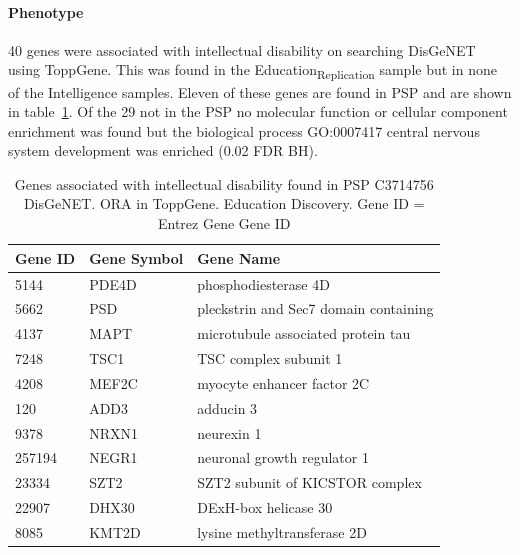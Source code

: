             \paragraph{Phenotype}
            40 genes were associated with intellectual disability on searching DisGeNET using ToppGene. This was found in the Education\textsubscript{Replication} sample but in none of the Intelligence samples. Eleven of these genes are found in PSP and are shown in table~\ref{tab:Genes associated with intellectual disability found in PSP Education Discovery}. 
            Of the 29 not in the PSP no molecular function or cellular component enrichment was found but the biological process
            GO:0007417 	central nervous system development 	was enriched (0.02 FDR BH). 
\begin{table}[ht]
\centering
\begin{tabular}{lll}
  \toprule
Gene ID & Gene Symbol & Gene Name \\ 
  \midrule
5144 & PDE4D & phosphodiesterase 4D \\ 
  5662 & PSD & pleckstrin and Sec7 domain containing \\ 
  4137 & MAPT & microtubule associated protein tau \\ 
  7248 & TSC1 & TSC complex subunit 1 \\ 
  4208 & MEF2C & myocyte enhancer factor 2C \\ 
  120 & ADD3 & adducin 3 \\ 
  9378 & NRXN1 & neurexin 1 \\ 
  257194 & NEGR1 & neuronal growth regulator 1 \\ 
  23334 & SZT2 & SZT2 subunit of KICSTOR complex \\ 
  22907 & DHX30 & DExH-box helicase 30 \\ 
  8085 & KMT2D & lysine methyltransferase 2D \\ 
   \bottomrule
\end{tabular}
\caption{Genes associated with intellectual disability found in PSP C3714756 DisGeNET. ORA in ToppGene. Education Discovery. Gene ID = Entrez Gene Gene ID} 
\label{tab:Genes associated with intellectual disability found in PSP Education Discovery}
\end{table}
